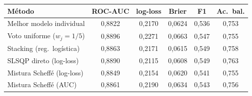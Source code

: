 \scriptsize\setlength{\tabcolsep}{3.5pt}
\begin{tabular}{lccccc}
\toprule
Método & ROC-AUC & log-loss & Brier & F1 & Ac.\ bal. \\
\midrule
Melhor modelo individual & 0{,}8822 & 0{,}2170 & 0{,}0624 & 0{,}536 & 0{,}753 \\
Voto uniforme ($w_j{=}1/5$) & 0{,}8896 & 0{,}2271 & 0{,}0663 & 0{,}547 & 0{,}755 \\
Stacking (reg.\ logística) & 0{,}8863 & 0{,}2171 & 0{,}0615 & 0{,}549 & 0{,}758 \\
SLSQP direto (log-loss) & 0{,}8890 & 0{,}2115 & 0{,}0608 & 0{,}549 & 0{,}763 \\
Mistura Scheffé (log-loss) & 0{,}8849 & 0{,}2154 & 0{,}0620 & 0{,}541 & 0{,}755 \\
Mistura Scheffé (AUC) & 0{,}8861 & 0{,}2190 & 0{,}0634 & 0{,}543 & 0{,}756 \\
\bottomrule
\end{tabular}